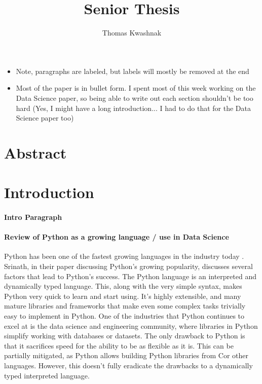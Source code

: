 \documentclass[12pt]{article}
\author{Thomas Kwashnak}
\title{Senior Thesis}
\newcommand{\CC}{C\nolinebreak\hspace{-.05em}\raisebox{.4ex}{\tiny\bf +}\nolinebreak\hspace{-.10em}\raisebox{.4ex}{\tiny\bf + }}
\begin{document}
\maketitle

\newpage


\begin{itemize}
	\item Note, paragraphs are labeled, but labels will mostly be removed at the end
	\item Most of the paper is in bullet form. I spent most of this week working on the Data Science paper, so being able to write out each section shouldn't be too hard (Yes, I might have a long introduction... I had to do that for the Data Science paper too)
\end{itemize}


\section{Abstract}

\section{Introduction}

\paragraph{Intro Paragraph}

\paragraph{Review of Python as a growing language / use in Data Science}

Python has been one of the fastest growing languages in the industry today \cite{article_python_growing_language}.
Srinath, in their paper discussing Python's growing popularity, discusses several factors that lead to Python's success.
The Python language is an interpreted and dynamically typed language.
This, along with the very simple syntax, makes Python very quick to learn and start using.
It's highly extensible, and many mature libraries and frameworks that make even some complex tasks trivially easy to implement in Python.
One of the industries that Python continues to excel at is the data science and engineering community, where libraries in Python simplify working with databases or datasets.
The only drawback to Python is that it sacrifices speed for the ability to be as flexible as it is.
This can be partially mitigated, as Python allows building Python libraries from \CC  or other languages.
However, this doesn't fully eradicate the drawbacks to a dynamically typed interpreted language.
\end{document}
